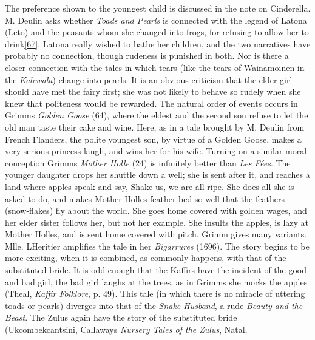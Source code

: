 \documentclass[14pt,a4paper]{memoir}
\begin{document}
The preference shown to the youngest child is discussed in the note on
Cinderella. M. Deulin asks whether \emph{Toads and Pearls} is connected
with the legend of Latona (Leto) and the peasants whom she changed into
frogs, for refusing to allow her to
drink\protect\hypertarget{4533318093929944247_33931-h-1.htm.xhtmlux5cux23FNanchor_67}{}{}\protect\hyperlink{4533318093929944247_33931-h-1.htm.xhtmlux5cux23Footnote_67}{{[}67{]}}.
Latona really wished to bathe her children, and the two narratives have
probably no connection, though rudeness is punished in both. Nor is
there a closer connection with the tales in which tears (like the tears
of Wainamoinen in the \emph{Kalewala}) change into pearls. It is an
obvious criticism that the elder girl should have met the fairy first;
she was not likely to behave so rudely when she knew that politeness
would be rewarded. The natural order of events occurs in
Grimm\textquotesingle s \emph{Golden Goose} (64), where the eldest and
the second son refuse to let the old man taste their cake and wine.
Here, as in a tale brought by M. Deulin from French Flanders, the polite
youngest son, by virtue of a Golden Goose, makes a very serious princess
laugh, and wins her for his wife. Turning on a similar moral conception
Grimm\textquotesingle s \emph{Mother Holle} (24) is infinitely better
than \emph{Les Fées}. The younger daughter drops her shuttle down a
well; she is sent after it, and reaches a land where apples speak and
say, \textquotesingle Shake us, we are all ripe.\textquotesingle{} She
does all she is asked to do, and makes Mother Holle\textquotesingle s
feather-bed so well that the feathers (snow-flakes) fly about the world.
She goes home covered with golden wages, and her elder sister follows
her, but not her example. She insults the apples, is lazy at Mother
Holle\textquotesingle s, and is sent home covered with pitch. Grimm
gives many variants. Mlle. L\textquotesingle Heritier amplifies the tale
in her \emph{Bigarrures} (1696). The story begins to be more exciting,
when it is combined, as commonly happens, with that of the substituted
bride. It is odd enough that the Kaffirs have the incident of the good
and bad girl, the bad girl laughs at the trees, as in
Grimm\textquotesingle s she mocks the apples (Theal, \emph{Kaffir
Folklore}, p. 49). This tale (in which there is no miracle of uttering
toads or pearls) diverges into that of the \emph{Snake Husband}, a rude
\emph{Beauty and the Beast}. The Zulus again have the story of the
substituted bride (\textquotesingle Ukcombekcantsini,\textquotesingle{}
Callaway\textquotesingle s \emph{Nursery Tales of the Zulus}, Natal,
\end{document}
